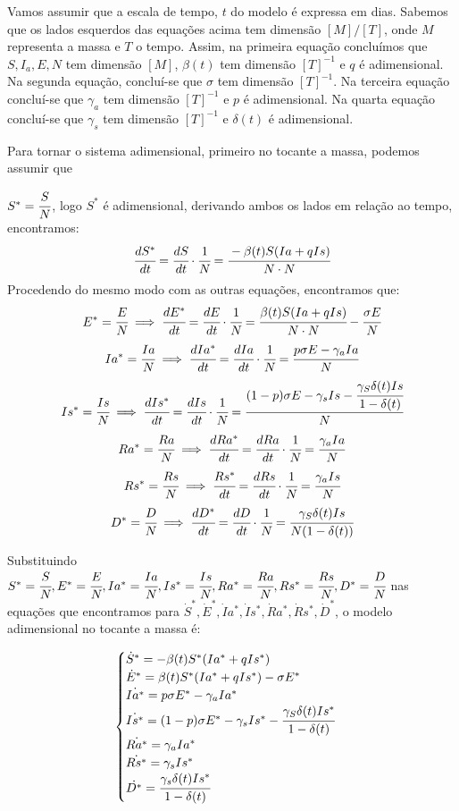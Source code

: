 \documentclass[12pt]{article}
\begin{document}
Vamos assumir que a escala de tempo, $t$ do modelo é expressa em dias. Sabemos que os lados esquerdos das equações acima tem dimensão $[M]/[T]$, onde $M$ representa a massa e $T$ o tempo. Assim, na primeira equação concluímos que $S, I_a, E, N$ tem dimensão $[M]$, $\beta(t)$ tem dimensão $[T]^{-1}$ e $q$ é adimensional. Na segunda equação, concluí-se que $\sigma$ tem dimensão $[T]^{-1}$. Na terceira equação concluí-se que $\gamma_a$ tem dimensão $[T]^{-1}$ e $p$ é adimensional. Na quarta equação concluí-se que $\gamma_s$ tem dimensão $[T]^{-1}$ e $\delta(t)$ é adimensional. 

Para tornar o sistema adimensional, primeiro no tocante a massa, podemos assumir que 

$S^* = \cfrac{S}{N}$, logo $S^*$ é adimensional, derivando ambos os lados em relação ao tempo, encontramos:
$$\cfrac{dS^*}{dt} = \cfrac{dS}{dt} \cdot \cfrac{1}{N} = \cfrac{-\beta(t)S(Ia + qIs)}{N \cdot N}$$
Procedendo do mesmo modo com as outras equações, encontramos que:
$$E^* = \cfrac{E}{N} \implies \cfrac{dE^*}{dt} = \cfrac{dE}{dt} \cdot \cfrac{1}{N} = \cfrac{\beta(t)S(Ia + qIs)}{N \cdot N} - \cfrac{\sigma E}{N}$$
$$Ia^* = \cfrac{Ia}{N} \implies \cfrac{dIa^*}{dt} = \cfrac{dIa}{dt} \cdot \cfrac{1}{N} = \cfrac{ p\sigma E - \gamma_aIa}{N}$$
$$Is^* = \cfrac{Is}{N} \implies \cfrac{dIs^*}{dt} = \cfrac{dIs}{dt} \cdot \cfrac{1}{N} = \cfrac{ (1-p)\sigma E - \gamma_sIs - \cfrac{\gamma_S \delta (t)Is}{1 - \delta(t)}}{N}$$
$$Ra^* = \cfrac{Ra}{N} \implies \cfrac{dRa^*}{dt} = \cfrac{dRa}{dt} \cdot \cfrac{1}{N} = \cfrac{\gamma_aIa}{N}$$
$$Rs^* = \cfrac{Rs}{N} \implies \cfrac{Rs^*}{dt} = \cfrac{dRs}{dt} \cdot \cfrac{1}{N} = \cfrac{\gamma_aIs}{N}$$
$$D^* = \cfrac{D}{N} \implies \cfrac{dD^*}{dt} = \cfrac{dD}{dt} \cdot \cfrac{1}{N} = \cfrac{\gamma_S \delta (t)Is}{N(1 - \delta(t))}$$



Substituindo $ S^* = \cfrac{S}{N}, E^* = \cfrac{E}{N}, Ia^* = \cfrac{Ia}{N},Is^* = \cfrac{Is}{N},Ra^* = \cfrac{Ra}{N},Rs^* = \cfrac{Rs}{N},D^* = \cfrac{D}{N} $ nas equações que encontramos para $\dot S^*,\dot E^*,\dot Ia^*,\dot Is^*,\dot Ra^*, \dot Rs^*, \dot D^*$, o modelo adimensional no tocante a massa é:
\begin{center}
$$
\begin{cases}
\dot S^* = -\beta(t)S^*(Ia^* + qIs^*) \\
\dot E^* = \beta(t)S^*(Ia^* + qIs^*) - \sigma E^* \\
\dot {Ia^*} = p\sigma E^* - \gamma_aIa^*\\
\dot {Is^*} = (1-p)\sigma E^* - \gamma_sIs^* - \cfrac{\gamma_S \delta (t)Is^*}{1 - \delta(t)}\\
\dot {Ra^*} = \gamma_aIa^*\\
\dot {Rs^*} = \gamma_sIs^*\\
\dot {D^*} = \cfrac{\gamma_s \delta (t)Is^*}{1 - \delta(t)}

\end{cases}
$$
\end{center}
\end{document}
